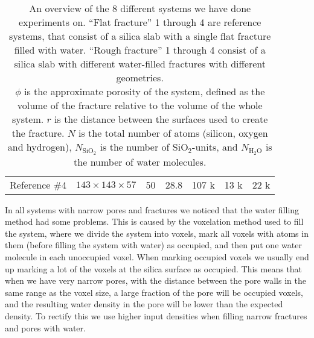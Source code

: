 \begin{table}[htpb]
\begin{tabular}{l|cccccc}
    Reference \#4           & $143 \times 143 \times 57$    & 50            & 28.8              & 107 k     & 13 k                  & 22 k                             \\ %
    \end{tabular}%
    \vspace{8pt}
    \caption{%
        An overview of the 8 different systems we have done experiments on. ``Flat fracture'' 1 through 4 are reference systems, that consist of a silica slab with a single flat fracture filled with water. ``Rough fracture'' 1 through 4 consist of a silica slab with different water-filled fractures with different geometries.%
        \\%
%
        $\phi$ is the approximate porosity of the system, defined as the volume of the fracture relative to the volume of the whole system. $r$ is the distance between the surfaces used to create the fracture. $N$ is the total number of atoms (silicon, oxygen and hydrogen), $N_\text{SiO$_2$}$ is the number of SiO$_2$-units, and $N_\text{H$_2$O}$ is the number of water molecules. %
%
        \label{tab:systems}%
    }
\end{table}%

In all systems with narrow pores and fractures we noticed that the water filling method had some problems. This is caused by the voxelation method used to fill the system, where we divide the system into voxels, mark all voxels with atoms in them (before filling the system with water) as occupied, and then put one water molecule in each unoccupied voxel. When marking occupied voxels we usually end up marking a lot of the voxels at the silica surface as occupied. This means that when we have very narrow pores, with the distance between the pore walls in the same range as the voxel size, a large fraction of the pore will be occupied voxels, and the resulting water density in the pore will be lower than the expected density. To rectify this we use higher input densities when filling narrow fractures and pores with water.

\FloatBarrier
